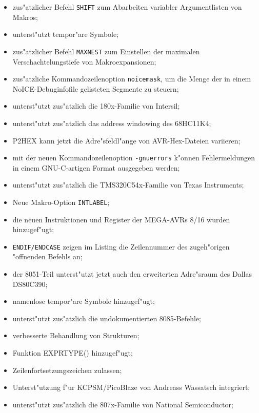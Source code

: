 \documentclass[12pt,a4paper,twoside]{report}
\begin{document}
\begin{itemize}
{\begin{itemize}
{            {\tt ARGCOUNT};}
      \item{zus"atzlicher Befehl {\tt SHIFT} zum Abarbeiten variabler
            Argumentlisten von Makros;}
      \item{unterst"utzt tempor"are Symbole;}
      \item{zus"atzlicher Befehl {\tt MAXNEST} zum Einstellen der
            maximalen Verschachtelungstiefe von Makroexpansionen;}
      \item{zus"atzliche Kommandozeilenoption {\tt noicemask}, um
            die Menge der in einem NoICE-Debuginfofile gelisteten Segmente
            zu steuern;}
      \item{unterst"utzt zus"atzlich die 180x-Familie von Intersil;}
      \item{unterst"utzt zus"atzlich das address windowing des 68HC11K4;}
      \item{P2HEX kann jetzt die Adre"sfeldl"ange von AVR-Hex-Dateien
            variieren;}
      \item{mit der neuen Kommandozeilenoption {\tt -gnuerrors} k"onnen
            Fehlermeldungen in einem GNU-C-artigen Format ausgegeben
            werden;}
      \item{unterst"utzt zus"atzlich die TMS320C54x-Familie von Texas
            Instruments;}
      \item{Neue Makro-Option {\tt INTLABEL};}
      \item{die neuen Instruktionen und Register der MEGA-AVRs 8/16
            wurden hinzugef"ugt;}
      \item{{\tt ENDIF/ENDCASE} zeigen im Listing die Zeilennummer des
            zugeh"origen "offnenden Befehls an;}
      \item{der 8051-Teil unterst"utzt jetzt auch den erweiterten
            Adre"sraum des Dallas DS80C390;}
      \item{namenlose tempor"are Symbole hinzugef"ugt;}
      \item{unterst"utzt zus"atzlich die undokumentierten 8085-Befehle;}
      \item{verbesserte Behandlung von Strukturen;}
      \item{Funktion EXPRTYPE() hinzugef"ugt;}
      \item{Zeilenfortsetzungszeichen zulassen;}
      \item{Unterst"utzung f"ur KCPSM/PicoBlaze von Andreass Wassatsch
            integriert;}
      \item{unterst"utzt zus"atzlich die 807x-Familie von National
            Semiconductor;}

\end{itemize}}
\end{itemize}
\end{document}
